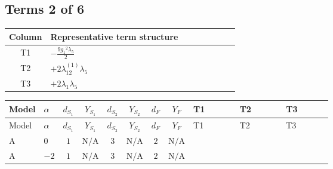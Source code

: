 \documentclass[8pt]{article}
\begin{document}
\begin{landscape}
\subsection*{Terms 2 of 6}
\begin{center}
\begin{tabular}{@{}c >{\raggedright\arraybackslash}p{0.82\linewidth}@{}}
\toprule
Column & Representative term structure \\
\midrule
T1 & \(\displaystyle -\frac{9 {g_1}^2 {\lambda_5}}{2}\) \\
\midrule
T2 & \(\displaystyle +2 {\lambda_{12}^{(1)}} {\lambda_5}\) \\
\midrule
T3 & \(\displaystyle +2 {\lambda_1} {\lambda_5}\) \\
\midrule
\bottomrule
\end{tabular}
\end{center}
\smallskip
\tiny
\begin{longtable}{@{}llcccccc >{\raggedright\arraybackslash}p{0.21\linewidth} >{\raggedright\arraybackslash}p{0.21\linewidth} >{\raggedright\arraybackslash}p{0.21\linewidth}@{}}
\toprule
Model & $\alpha$ & $d_{S_1}$ & $Y_{S_1}$ & $d_{S_2}$ & $Y_{S_2}$ & $d_F$ & $Y_F$ & T1 & T2 & T3 \\
\midrule
\endfirsthead
\toprule
Model & $\alpha$ & $d_{S_1}$ & $Y_{S_1}$ & $d_{S_2}$ & $Y_{S_2}$ & $d_F$ & $Y_F$ & T1 & T2 & T3 \\
\midrule
\endhead
A & $0$ & $1$ & $\text{N/A}$ & $3$ & $\text{N/A}$ & $2$ & $\text{N/A}$ & \scriptsize\adjustbox{max width=\linewidth}{$\begin{gathered} -\frac{9 {g_1}^2 {\lambda_5}}{2}\end{gathered}$} & \scriptsize\adjustbox{max width=\linewidth}{$\begin{gathered} +2 {\lambda_{12}^{(1)}} {\lambda_5}\end{gathered}$} & \scriptsize\adjustbox{max width=\linewidth}{$\begin{gathered} +2 {\lambda_1} {\lambda_5}\end{gathered}$} \\
\midrule
A & $-2$ & $1$ & $\text{N/A}$ & $3$ & $\text{N/A}$ & $2$ & $\text{N/A}$ & \scriptsize\adjustbox{max width=\linewidth}{$\begin{gathered} -\frac{9 {g_1}^2 {\lambda_5}}{2}\end{gathered}$} & \scriptsize\adjustbox{max width=\linewidth}{$\begin{gathered} +2 {\lambda_{12}^{(1)}} {\lambda_5}\end{gathered}$} & \scriptsize\adjustbox{max width=\linewidth}{$\begin{gathered} +2 {\lambda_1} {\lambda_5}\end{gathered}$} \\

\end{longtable}
\end{landscape}
\end{document}
